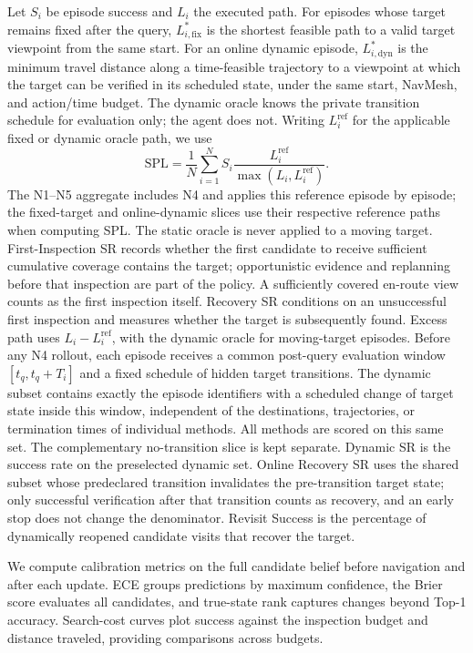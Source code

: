 Let $S_i$ be episode success and $L_i$ the executed path. For episodes whose
target remains fixed after the query, $L_{i,\mathrm{fix}}^*$ is the shortest
feasible path to a valid target viewpoint from the same start. For an online
dynamic episode, $L_{i,\mathrm{dyn}}^*$ is the minimum travel distance along
a time-feasible trajectory to a viewpoint at which the target can be verified
in its scheduled state, under the same start, NavMesh, and action/time budget. The
dynamic oracle knows the private transition schedule for evaluation only; the
agent does not. Writing $L_i^{\mathrm{ref}}$ for the applicable fixed or dynamic
oracle path, we use
\begin{equation}
\mathrm{SPL}=\frac{1}{N}\sum_{i=1}^{N}S_i
\frac{L_i^{\mathrm{ref}}}{\max(L_i,L_i^{\mathrm{ref}})}.
\end{equation}
The N1--N5 aggregate includes N4 and applies this reference episode by episode;
the fixed-target and online-dynamic slices use their respective reference
paths when computing SPL. The static oracle is never applied to a moving target.
First-Inspection SR records whether the first candidate to receive sufficient
cumulative coverage contains the target; opportunistic evidence and replanning
before that inspection are part of the policy. A sufficiently covered en-route
view counts as the first inspection itself. Recovery SR conditions on an
unsuccessful first inspection and measures whether the target is subsequently
found. Excess path uses $L_i-L_i^{\mathrm{ref}}$, with the dynamic oracle for
moving-target episodes. Before any N4 rollout, each episode receives a common
post-query evaluation window $[t_q,t_q+T_i]$ and a fixed schedule of hidden
target transitions. The dynamic subset contains exactly the episode identifiers
with a scheduled change of target state inside this window, independent of the
destinations, trajectories, or termination times of individual methods. All methods are scored
on this same set. The complementary no-transition slice is kept separate.
Dynamic SR is the success rate on the preselected dynamic set. Online Recovery SR uses
the shared subset whose predeclared transition invalidates the
pre-transition target state; only successful verification after that transition counts
as recovery, and an early stop does not change the denominator. Revisit Success
is the percentage of dynamically reopened candidate visits that recover the
target.

We compute calibration metrics on the full candidate belief before navigation and after each update. ECE groups predictions by maximum confidence, the Brier score evaluates all candidates, and true-state rank captures changes beyond Top-1 accuracy. Search-cost curves plot success against the inspection budget and distance traveled, providing comparisons across budgets.

